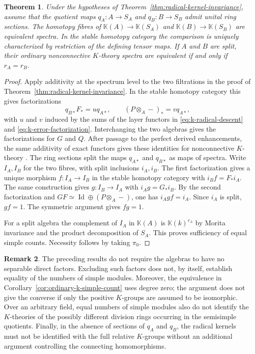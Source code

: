 \documentclass[12pt,a4paper,english,reqno]{amsart}
\numberwithin{equation}{section}
\theoremstyle{plain}
\newtheorem{theorem}{Theorem}[section]
\theoremstyle{definition}
\newtheorem{remark}[theorem]{Remark}
\begin{document}
\begin{theorem}\label{thm:radical-spectra}
Under the hypotheses of Theorem~\ref{thm:radical-kernel-invariance},
assume that the quotient maps $q_A:A\to S_A$ and $q_B:B\to S_B$
admit unital ring sections. The homotopy fibres of
$\mathbb K(A)\to\mathbb K(S_A)$ and
$\mathbb K(B)\to\mathbb K(S_B)$ are equivalent spectra.
In the stable homotopy category the comparison is uniquely
characterized by restriction of the defining tensor maps.
If $A$ and $B$ are split, their ordinary nonconnective
$K$-theory spectra are equivalent if and only if
$r_A=r_B$.
\end{theorem}

\begin{proof}
Apply additivity at the spectrum level to the two filtrations
in the proof of Theorem~\ref{thm:radical-kernel-invariance}.
In the stable homotopy category this gives factorizations
\[
 q_{B*}F_*=u q_{A*},\qquad (P\otimes_A-)_*=v q_{A*},
\]
with $u$ and $v$ induced by the sums of the layer functors in
\eqref{eq:k-radical-descent} and \eqref{eq:k-error-factorization}.
Interchanging the two algebras gives the factorizations for
$G$ and $Q$. After passage to the perfect derived enhancements,
the same additivity of exact functors gives these identities
for nonconnective $K$-theory \cite{BGT2013}. The ring sections split the
maps $q_{A*}$ and $q_{B*}$ as maps of spectra. Write $I_A,I_B$
for the two fibres, with split inclusions $i_A,i_B$.
The first factorization gives a unique morphism
$f:I_A\to I_B$ in the stable homotopy category with
$i_Bf=F_*i_A$. The same construction gives $g:I_B\to I_A$
with $i_Ag=G_*i_B$. By the second factorization and
$GF\simeq\operatorname{Id}\oplus(P\otimes_A-)$, one has
$i_Agf=i_A$. Since $i_A$ is split, $gf=1$. The symmetric
argument gives $fg=1$.

For a split algebra the complement of $I_A$ in $\mathbb K(A)$ is
$\mathbb K(k)^{r_A}$ by Morita invariance and the product
decomposition of $S_A$. This proves sufficiency of equal simple
counts. Necessity follows by taking $\pi_0$.
\end{proof}

\begin{remark}\label{rem:k-theory-scope}
The preceding results do not require the algebras to have no
separable direct factors. Excluding such factors does not, by
itself, establish equality of the numbers of simple modules.
Moreover, the equivalence in Corollary~\ref{cor:ordinary-k-simple-count}
uses degree zero; the argument does not give the converse if only
the positive $K$-groups are assumed to be isomorphic. Over an
arbitrary field, equal numbers of simple modules also do not
identify the $K$-theories of the possibly different division rings
occurring in the semisimple quotients. Finally, in the absence of
sections of $q_A$ and $q_B$, the radical kernels must not be
identified with the full relative $K$-groups without an additional
argument controlling the connecting homomorphisms.
\end{remark}
\end{document}
